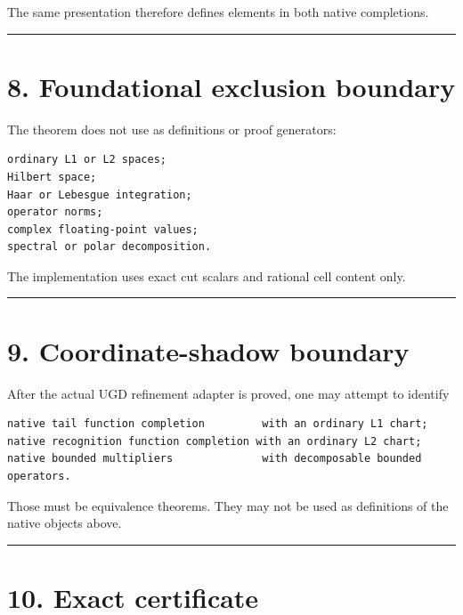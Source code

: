 The same presentation therefore defines elements in both native completions.

\begin{center}\rule{0.5\linewidth}{0.5pt}\end{center}

\hypertarget{foundational-exclusion-boundary}{%
\section{8. Foundational exclusion boundary}\label{foundational-exclusion-boundary}}

The theorem does not use as definitions or proof generators:

\begin{verbatim}
ordinary L1 or L2 spaces;
Hilbert space;
Haar or Lebesgue integration;
operator norms;
complex floating-point values;
spectral or polar decomposition.
\end{verbatim}

The implementation uses exact cut scalars and rational cell content only.

\begin{center}\rule{0.5\linewidth}{0.5pt}\end{center}

\hypertarget{coordinate-shadow-boundary}{%
\section{9. Coordinate-shadow boundary}\label{coordinate-shadow-boundary}}

After the actual UGD refinement adapter is proved, one may attempt to identify

\begin{verbatim}
native tail function completion         with an ordinary L1 chart;
native recognition function completion with an ordinary L2 chart;
native bounded multipliers              with decomposable bounded operators.
\end{verbatim}

Those must be equivalence theorems. They may not be used as definitions of the
native objects above.

\begin{center}\rule{0.5\linewidth}{0.5pt}\end{center}

\hypertarget{exact-certificate}{%
\section{10. Exact certificate}\label{exact-certificate}}

